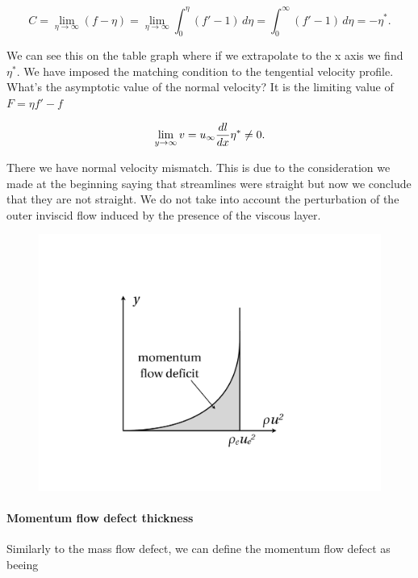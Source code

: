 			\begin{equation}
				C = \lim _{\eta \rightarrow \infty}  (f-\eta ) = \lim _{\eta \rightarrow \infty}  \int _0 ^\eta (f'-1) \, d\eta = \int _0^\infty (f'-1)\, d\eta = -\eta ^*.
			\end{equation}
			
			We can see this on the table graph where if we extrapolate to the x axis we find $\eta ^*$. We have imposed the matching condition to the tengential velocity profile. What's the asymptotic value of the normal velocity? It is the limiting value of $F = \eta f' - f$ 
			
			\begin{equation}
				\lim _{y \rightarrow \infty} v = \uinf \frac{dl}{dx}\eta ^*\neq 0.
			\end{equation}
			
			There we have normal velocity mismatch. This is due to the consideration we made at the beginning saying that streamlines were straight but now we conclude that they are not straight. We do not take into account the perturbation of the outer inviscid flow induced by the presence of the viscous layer. 
			
			\begin{figure}
			\vspace{0mm}
			\includegraphics[scale=0.23]{ch5/10}
			\label{fig:5.10}
			\end{figure}
			\paragraph{Momentum flow defect thickness}
			Similarly to the mass flow defect, we can define the momentum flow defect as beeing 
			
